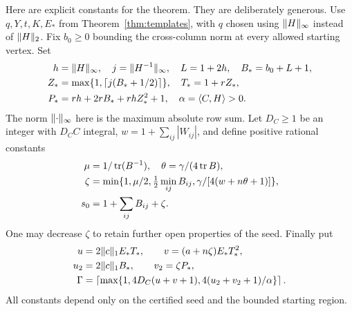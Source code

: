 Here are explicit constants for the theorem. They are deliberately generous. Use $q,Y,t,K,E_*$ from Theorem~\ref{thm:templates}, with $q$ chosen using $\lVert H\rVert_\infty$ instead of $\lVert H\rVert_2$. Fix $b_0\ge0$ bounding the cross-column norm at every allowed starting vertex. Set
\[
 \begin{split}
 h&=\lVert H\rVert_\infty,\quad j=\lVert H^{-1}\rVert_\infty,\quad
 L=1+2h,\quad B_*=b_0+L+1,\\
 Z_*&=\max\{1,\lceil j(B_*+1/2)\rceil\},\quad T_*=1+rZ_*,\\
 P_*&=rh+2rB_*+rhZ_*^2+1,\quad
 \alpha=\langle C,H\rangle>0.
 \end{split}
\]
The norm $\lVert \cdot\rVert_\infty$ here is the maximum absolute row sum. Let $D_C\ge1$ be an integer with $D_CC$ integral, $w=1+\sum_{ij}|W_{ij}|$, and define positive rational constants
\begin{equation}\label{eq:robustconstants}
 \begin{split}
 \mu&=1/\operatorname{tr}(B^{-1}),\quad \theta=\gamma/(4\operatorname{tr} B),\\
 \zeta&=\min\{1,\mu/2,\tfrac12\min_{ij}B_{ij},
                    \gamma/[4(w+n\theta+1)]\},\\
 s_0&=1+\sum_{ij}B_{ij}+\zeta.
 \end{split}
\end{equation}
One may decrease $\zeta$ to retain further open properties of the seed. Finally put
\[
 \begin{split}
 u&=2\lVert c\rVert_1 E_*T_*,\qquad v=(a+n\zeta)E_*T_*^2,\\
 u_2&=2\lVert c\rVert_1 B_*,\qquad v_2=\zeta P_*,\\
 \Gamma&=\left\lceil\max\{1,4D_C(u+v+1),4(u_2+v_2+1)/\alpha\}\right\rceil.
 \end{split}
\]
All constants depend only on the certified seed and the bounded starting region.

